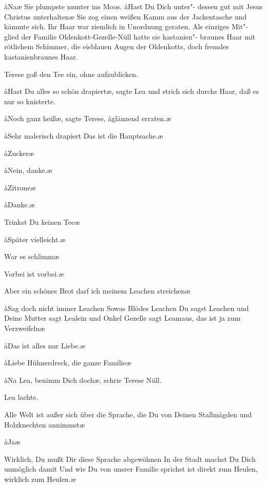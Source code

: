 \aa{}Na\frag{}\ae{} Sie plumpste munter ins Moos. \aa{}Hast Du Dich unter"-%
dessen gut mit Jesus Christus unterhalten\frag{}\ae{} Sie zog einen
weißen Kamm aus der Jackentasche und kämmte sich. Ihr
Haar war ziemlich in Unordnung geraten. Als einziges Mit"-%
glied der Familie Oldenkott-Gezelle-Nüll hatte sie kastanien"-%
braunes Haar mit rötlichem Schimmer, die eisblauen Augen
der Oldenkotts, doch fremdes kastanienbraunes Haar.

Terese goß den Tee ein, ohne aufzublicken.

\aa{}Hast Du alles so schön drapiert\frag{}\ae{}, sagte Lea und strich sich
durchs Haar, daß es nur so knisterte.

\aa{}Noch ganz heiß\ae{},\eingriff{eS26-1}{heiß\ae{}, ] heiß,\ae{}} sagte Terese, \aa{}glänzend erraten.\ae{}

\aa{}Sehr malerisch drapiert\ausr{} Das ist die Hauptsache.\ae{}

\aa{}Zucker\frag{}\ae{}

\aa{}Nein, danke.\ae{}

\aa{}Zitrone\frag{}\ae{}

\aa{}Danke.\ae{}

\aanah{}Trinkst Du keinen Tee\frag{}\ae{}

\aa{}Später vielleicht.\ae{}

\aanah{}War es schlimm\frag{}\ae{}

\aanah{}Vorbei ist vorbei.\ae{}

\aanah{}Aber ein schönes Brot darf ich meinem Leachen streichen\frag{}\ae{}

\aa{}Sag doch nicht immer Leachen\ausr{} Sowas Blödes\ausr{} Leachen\ausr{}
Du sagst Leachen und Deine Mutter sagt Lealein und Onkel
Gezelle sagt Leamaus, das ist ja zum Verzweifeln\ausr{}\ae{}

\aa{}Das ist alles nur Liebe.\ae{}

\aa{}Liebe\ausr{} Hühnerdreck, die ganze Familie\ausr{}\ae{}

\aa{}Na Lea, benimm Dich doch\ae{}, schrie Terese Nüll.

Lea lachte.

\aanah{}Alle Welt ist außer sich über die Sprache, die Du von Deinen
Stallmägden und Holzknechten annimmst\ausr{}\ae{}

\aa{}Ja\frag{}\ae{}

\aanah{}Wirklich, Du mußt Dir diese Sprache abgewöhnen\ausr{} In der
Stadt machst Du Dich unmöglich damit\ausr{} Und wie Du von
unsrer Familie sprichst ist direkt zum Heulen, wirklich zum
Heulen.\ae{}

